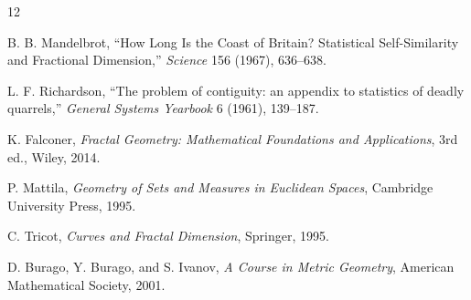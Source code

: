 \documentclass[11pt,a4paper]{article}
\theoremstyle{definition}
\theoremstyle{plain}
\theoremstyle{remark}
\begin{document}
\begin{thebibliography}{12}

B. B. Mandelbrot,
``How Long Is the Coast of Britain? Statistical Self-Similarity and
Fractional Dimension,''
\emph{Science} 156 (1967), 636--638.

L. F. Richardson,
``The problem of contiguity: an appendix to statistics of deadly
quarrels,''
\emph{General Systems Yearbook} 6 (1961), 139--187.

K. Falconer,
\emph{Fractal Geometry: Mathematical Foundations and Applications},
3rd ed., Wiley, 2014.

P. Mattila,
\emph{Geometry of Sets and Measures in Euclidean Spaces},
Cambridge University Press, 1995.

C. Tricot,
\emph{Curves and Fractal Dimension},
Springer, 1995.

D. Burago, Y. Burago, and S. Ivanov,
\emph{A Course in Metric Geometry},
American Mathematical Society, 2001.

\end{thebibliography}
\end{document}
